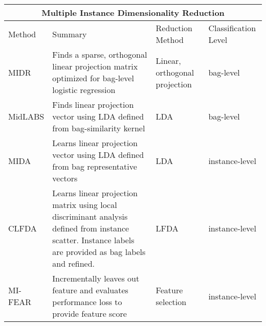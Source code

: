 \begin{table}[H]
\caption{Summary of multiple instance dimensionality reduction approches.}
\label{tab:MIDRComparison}
\begin{longtable}{ |p{2cm}|p{6cm}|p{2cm}|p{3cm}|  } 
	\hline
	\multicolumn{4}{|c|}{\textbf{Multiple Instance Dimensionality Reduction}} \\
	\hline
	Method & Summary & Reduction Method & Classification Level\\
	\hline
	MIDR   & Finds a sparse, orthogonal linear projection matrix optimized for bag-level logistic regression   &Linear, orthogonal projection  &  bag-level\\
	MidLABS&  Finds linear projection vector using LDA defined from bag-similarity kernel  & LDA   & bag-level\\
	MIDA &Learns linear projection vector using LDA defined from bag representative vectors & LDA &  instance-level\\
	CLFDA  &Learns linear projection matrix using local discriminant analysis defined from instance scatter.  Instance labels are provided as bag labels and refined. & LFDA &  instance-level\\
	MI-FEAR &  Incrementally leaves out feature and evaluates performance loss to provide feature score  & Feature selection & instance-level\\
	\hline
\end{longtable}
\end{table}

